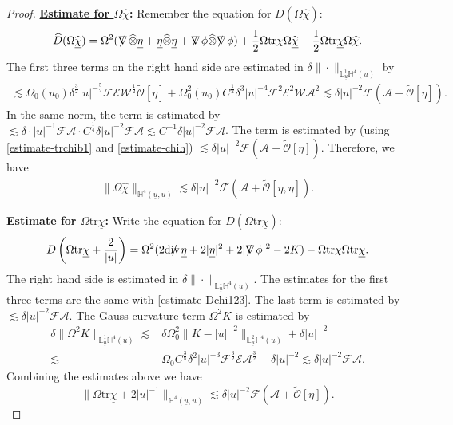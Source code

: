 \documentclass[11pt,reqno]{amsart}
\theoremstyle{definition}
\numberwithin{equation}{section}
\newcommand{\tr}{\mathrm{tr}}
\renewcommand{\L}{\mathbb{L}}
\renewcommand{\H}{\mathbb{H}}
\def\chib{\underline{\chi}}
\def\chibh{\widehat{\underline{\chi}}}
\def\chih{\widehat{\chi}}
\def\etab{\underline{\eta}}
\def\tr{\mathrm{tr}}
\def\tensor{\widehat{\otimes}}
\def\ub{\underline{u}}
\newcommand{\Dh}{\widehat{D}}
\def\nablas{\mbox{$\nabla \mkern -13mu /$ }}
\def\divs{\mbox{$\mathrm{div} \mkern -13mu /$ }}
\def\ds{\mbox{$\nabla \mkern -13mu /$ }}
\begin{document}
\begin{proof}
{\bf \underline{Estimate for $\Omega\chibh$}:} Remember the equation for $D(\Omega\chibh)$:
\begin{align}\label{equ-Dchibh}\Dh(\Omega\chibh)=\Omega^2(\nablas \tensor \etab + \etab \tensor \etab +\ds\phi\tensor\ds\phi)+\frac{1}{2}\Omega\tr\chi\Omega\chibh-\frac{1}{2}\Omega\tr\chib \Omega\chih.\end{align}
The first three terms on the right hand side are estimated in $\delta\|\cdot\|_{\L_{\ub}^1\H^4(u)}$ by
\begin{align}\label{estimate-Dchi123}
\lesssim \Omega_0(u_0)\delta^{\frac{3}{2}}|u|^{-\frac{5}{2}}\mathscr{F}\mathscr{E}\mathscr{W}^{\frac{1}{2}}\widetilde{\mathcal{O}}[\etab]+\Omega_0^2(u_0)C^{\frac{1}{2}}\delta^3|u|^{-4}\mathscr{F}^2\mathscr{E}^2\mathscr{W}\mathcal{A}^2\lesssim \delta|u|^{-2}\mathscr{F}(\mathcal{A}+\widetilde{\mathcal{O}}[\etab]).
\end{align}
 In the same norm, the  term is estimated by $\lesssim\delta\cdot|u|^{-1}\mathscr{F}\mathcal{A}\cdot C^{\frac{1}{4}}\delta|u|^{-2}\mathscr{F}\mathcal{A}\lesssim C^{-1}\delta|u|^{-2}\mathscr{F}\mathcal{A}$. The  term is estimated by (using \eqref{estimate-trchib1} and \eqref{estimate-chih}) $\lesssim\delta|u|^{-2}\mathscr{F}(\mathcal{A}+\widetilde{\mathcal{O}}[\eta])$.
Therefore, we have
\begin{align}\label{estimate-chibh}
\|\Omega\chibh\|_{\H^4(\ub,u)}\lesssim \delta|u|^{-2}\mathscr{F}(\mathcal{A}+\widetilde{\mathcal{O}}[\eta,\etab]).
\end{align}

{\bf \underline{Estimate for $\Omega\tr\chib$}:} Write the equation for $D(\Omega\tr\chib)$:
\begin{equation}\label{equ-Dtrchib}D\left(\Omega\tr\chib+\frac{2}{|u|}\right)=\Omega^2(2\divs\etab+2|\etab|^2+2|\ds\phi|^2-2K)-\Omega\tr\chi\Omega\tr\chib.\end{equation}
The right hand side is estimated in $\delta\|\cdot\|_{\L_{\ub}^1\H^4(u)}$. The estimates for the first three terms are the same with \eqref{estimate-Dchi123}. The last term is estimated by $\lesssim\delta|u|^{-2}\mathscr{F}\mathcal{A}$. The Gauss curvature term $\Omega^2K$ is estimated by
\begin{equation}\label{estimate-K1}
\begin{split}
\delta\|\Omega^2K\|_{\L^1_{\ub}\H^4(u)}\lesssim&\delta\Omega_0^2\|K-|u|^{-2}\|_{\L^2_{\ub}\H^4(u)}+\delta|u|^{-2}\\\lesssim& \Omega_0C^{\frac{3}{8}}\delta^2|u|^{-3}\mathscr{F}^{\frac{3}{2}}\mathscr{E}\mathcal{A}^{\frac{3}{2}}+\delta|u|^{-2}\lesssim\delta|u|^{-2}\mathscr{F}\mathcal{A}.
\end{split}
\end{equation}
Combining the estimates above we have
\begin{equation}\label{estimate-trchib}
\|\Omega\tr\chib+2|u|^{-1}\|_{\H^4(\ub,u)}\lesssim\delta|u|^{-2}\mathscr{F}(\mathcal{A}+\widetilde{\mathcal{O}}[\eta]).\end{equation}


\end{proof}
\end{document}
